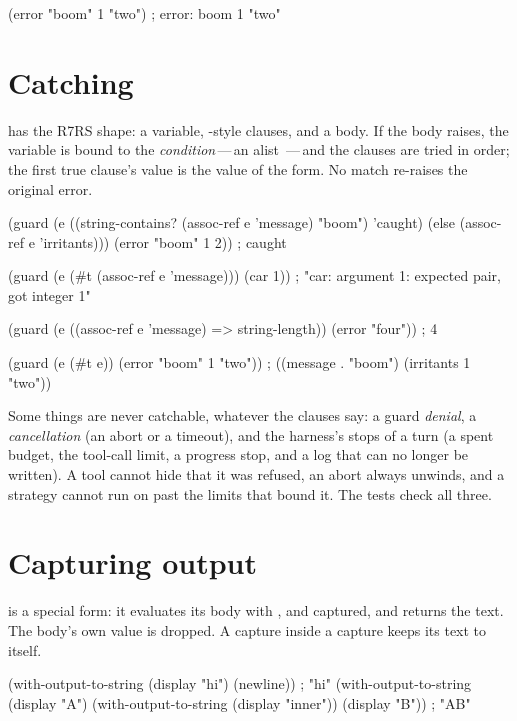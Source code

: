 \begin{scm}
(error "boom" 1 "two")    ; error: boom 1 "two"
\end{scm}

\section{Catching}

 has the R7RS shape: a variable, -style clauses, and
a body. If the body raises, the variable is bound to the
\emph{condition}\,---\,an alist \,---\,and the clauses are tried in order; the first true clause's value
is the value of the form. No match re-raises the original error.

\begin{scm}
(guard (e ((string-contains? (assoc-ref e 'message) "boom") 'caught)
          (else (assoc-ref e 'irritants)))
  (error "boom" 1 2))                        ; caught

(guard (e (#t (assoc-ref e 'message)))
  (car 1))                                   ; "car: argument 1: expected pair, got integer 1"

(guard (e ((assoc-ref e 'message) => string-length))
  (error "four"))                            ; 4

(guard (e (#t e))
  (error "boom" 1 "two"))                    ; ((message . "boom") (irritants 1 "two"))
\end{scm}

Some things are never catchable, whatever the clauses say: a guard
\emph{denial}, a \emph{cancellation} (an abort or a timeout), and the
harness's stops of a turn (a spent budget, the tool-call limit, a progress
stop, and a log that can no longer be written). A tool cannot hide that it
was refused, an abort always unwinds, and a strategy cannot run on past the
limits that bound it. The tests check all three.

\section{Capturing output}

 is a special form: it evaluates its body with
,  and  captured, and returns the
text. The body's own value is dropped. A capture inside a capture keeps its
text to itself.

\begin{scm}
(with-output-to-string (display "hi") (newline))   ; "hi\n"
(with-output-to-string
  (display "A")
  (with-output-to-string (display "inner"))
  (display "B"))                                   ; "AB"
\end{scm}

